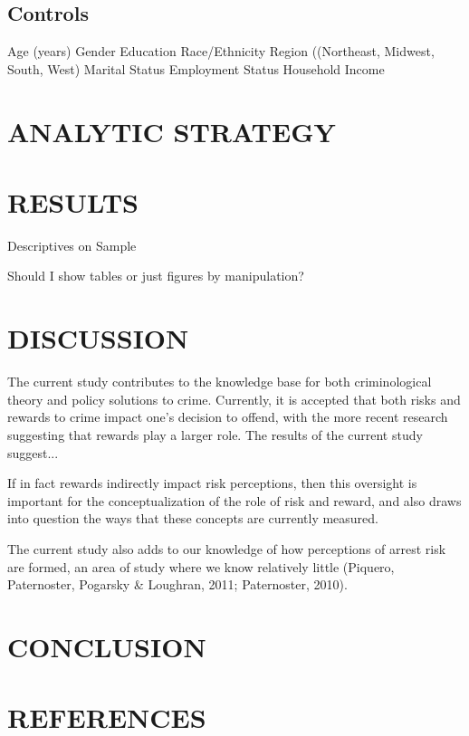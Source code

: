 \documentclass{article} %
\begin{document}
\begin{enumerate}[A]
{\subsection{Controls}

Age (years)
Gender
Education
Race/Ethnicity 
Region ((Northeast, Midwest, South, West)
Marital Status
Employment Status
Household Income



\section{ANALYTIC STRATEGY}

\section{RESULTS}


Descriptives on Sample

Should I show tables or just figures by manipulation?




\section{DISCUSSION}

The current study contributes to the knowledge base for both criminological theory and policy solutions to crime. Currently, it is accepted that both risks and rewards to crime impact one’s decision to offend, with the more recent research suggesting that rewards play a larger role. The results of the current study suggest...

 If in fact rewards indirectly impact risk perceptions, then this oversight is important for the conceptualization of the role of risk and reward, and also draws into question the ways that these concepts are currently measured.

The current study also adds to our knowledge of how perceptions of arrest risk are formed, an area of study where we know relatively little (Piquero, Paternoster, Pogarsky & Loughran, 2011; Paternoster, 2010). 



\section{CONCLUSION}

\section{REFERENCES}


}
\end{enumerate}
\end{document}
